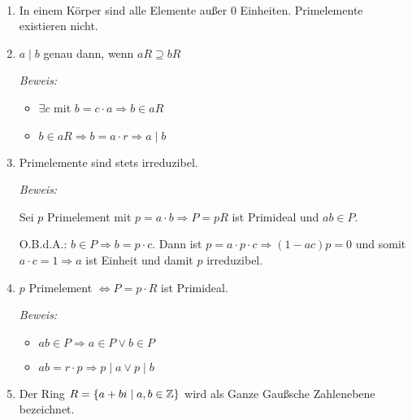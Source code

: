 \begin{mylemma}\ \label{lem2.9}

    \begin{enumerate}
        \item In einem Körper sind alle Elemente außer $0$ Einheiten. Primelemente existieren nicht.
        \item $a \mid b$ genau dann, wenn $aR \supseteq bR$

            \textit{Beweis:}
            \begin{itemize}
                \item $\exists c$ mit $b = c \cdot a \Rightarrow b \in aR$
                \item $b \in aR \Rightarrow b = a \cdot r \Rightarrow a \mid b$
            \end{itemize}
        \item Primelemente sind stets irreduzibel.\label{lem2.9.3}

            \textit{Beweis:}

            Sei $p$ Primelement mit $p = a \cdot b \Rightarrow P = pR$ ist Primideal und $ab \in P.$

            O.B.d.A.: $b \in P \Rightarrow b = p \cdot c$.
            Dann ist $p = a \cdot p \cdot c \Rightarrow (1 - ac)p = 0$ und somit $a \cdot c = 1 \Rightarrow a$ ist Einheit und damit $p$ irreduzibel.
        \item $p$ Primelement $\Leftrightarrow P = p \cdot R$ ist Primideal.\label{lem2.9.4}

            \textit{Beweis:}
            \begin{itemize}
                \item $ab \in P \Rightarrow a \in P \vee b \in P$
                \item $ab = r \cdot p \Rightarrow p \mid a \vee p\mid b$
            \end{itemize}
        \item Der Ring $R = \{a + bi \mid a, b\in \mathbb{Z} \}$ wird als Ganze Gaußsche Zahlenebene bezeichnet.
    \end{enumerate}
\end{mylemma}


